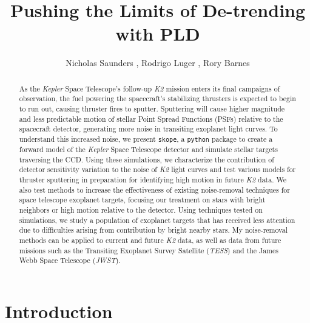 \documentclass[12pt,preprint]{aastex}
\begin{document}
\title{Pushing the Limits of De-trending with PLD}


\author{Nicholas Saunders , Rodrigo Luger , Rory Barnes }


\begin{abstract}

	As the \textit{Kepler} Space Telescope's follow-up \textit{K2} mission enters its final campaigns of observation, the fuel powering the spacecraft's stabilizing thrusters is expected to begin to run out, causing thruster fires to sputter. Sputtering will cause higher magnitude and less predictable motion of stellar Point Spread Functions (PSFs) relative to the spacecraft detector, generating more noise in transiting exoplanet light curves. To understand this increased noise, we present \texttt{skope}, a \texttt{python} package to create a forward model of the \textit{Kepler} Space Telescope detector and simulate stellar targets traversing the CCD. Using these simulations, we characterize the contribution of detector sensitivity variation to the noise of \textit{K2} light curves and test various models for thruster sputtering in preparation for identifying high motion in future \textit{K2} data. We also test methods to increase the effectiveness of existing noise-removal techniques for space telescope exoplanet targets, focusing our treatment on stars with bright neighbors or high motion relative to the detector. Using techniques tested on simulations, we study a population of exoplanet targets that has received less attention due to difficulties arising from contribution by bright nearby stars. My noise-removal methods can be applied to current and future \textit{K2} data, as well as data from future missions such as the Transiting Exoplanet Survey Satellite (\textit{TESS}) and the James Webb Space Telescope (\textit{JWST}).

\end{abstract}

\section{Introduction}
\end{document}
